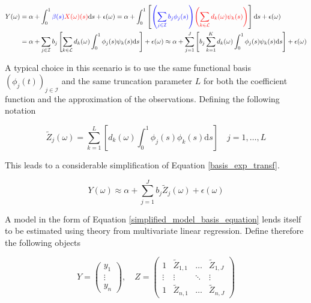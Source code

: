 \documentclass[11pt,twoside,a4paper]{article}
\begin{document}
	\begin{equation}\label{basis_exp_transf}
		\begin{split}
			Y(\omega) & = \alpha + \int_{0}^{1} {\color{blue}\beta(s)} {\color{red}X(\omega)(s)}\mathrm{d}s + \epsilon(\omega)
			 = \alpha + \int_{0}^{1}\left[{\color{blue}\left(\sum_{j \in \mathcal{I}} b_j  \phi_j(s)\right)} {\color{red}\left(\sum_{k \in \mathcal{L}} d_k(\omega)  \psi_k(s)\right)} \right]\mathrm{d}s + \epsilon(\omega) \\
			& = \alpha + \sum_{j \in \mathcal{I}} b_j \left[\sum_{k \in \mathcal{L}} d_k(\omega) \int_{0}^{1} \phi_j(s) \psi_k(s) \mathrm{d}s\right] + \epsilon(\omega) 
			\approx \alpha + \sum_{j = 1}^{J} \left[b_j \sum_{k = 1}^{K}  d_k(\omega) \int_{0}^{1} \phi_j(s) \psi_k(s) \mathrm{d}s\right] + \epsilon(\omega)
		\end{split}
	\end{equation}

	A typical choice in this scenario is to use the same functional basis $\left(\phi_j(t)\right)_{j \in \mathcal{I}}$ and the same truncation parameter $L$ for both the coefficient function and the approximation of the observations. Defining the following notation 

	\begin{equation}
			\tilde{Z}_j(\omega) = \sum_{k = 1}^{L} \left[d_k(\omega) \int_{0}^{1} \phi_j(s) \phi_k(s) \mathrm{d}s \right] \quad j = 1, \dots, L
	\end{equation}

	This leads to a considerable simplification of Equation \ref{basis_exp_transf}.
	
	\begin{equation}\label{simplified_model_basis_equation}
		Y(\omega) \approx \alpha + \sum_{j = 1}^{J} b_j \tilde{Z}_j(\omega) + \epsilon(\omega)
	\end{equation}

	A model in the form of Equation \ref{simplified_model_basis_equation} lends itself to be estimated using theory from multivariate linear regression. Define therefore the following objects
	
	\begin{equation}
		Y = \begin{pmatrix}
				y_1 \\ \vdots \\ y_n
			\end{pmatrix}, \quad
		Z = \begin{pmatrix}
				1 & \tilde{Z}_{1,1} & \dots & \tilde{Z}_{1,J} \\
				\vdots & \vdots & \ddots & \vdots \\
				1 & \tilde{Z}_{n,1} & \dots & \tilde{Z}_{n,J}
			\end{pmatrix}
	\end{equation}
	
\end{document}
